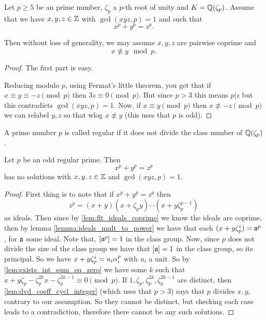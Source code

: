 \begin{lemma}\label{lemma:may_assume}

	Let $p \geq 5$ be an prime number, $\zeta_p$ a $p$-th root of unity and $K=\mathbb{Q}(\zeta_p)$.  Assume that we have $x,y,z \in \mathbb{Z}$ with $\gcd(xyz,p)=1$ and such that \[x^p+y^p=z^p.\]

Then without loss of generality, we may assume $x,y,z$ are pairwise coprime and \[x \not \equiv y \mod p.\]
\end{lemma}



\begin{proof}
The first part is easy.

Reducing modulo $p$, using Fermat's little theorem, you get that if $x \equiv y \equiv -z \pmod p$ then $3z \equiv 0 \pmod p$. But since $p >3$ this means $p |z$ but this contradicts $\gcd(xyz,p)=1$. Now, if $x \equiv y \pmod p$ then  $x \not \equiv -z \pmod p$ we can relabel $y,z$ so that wlog $x \not \equiv y$ (this uses that $p$ is odd).

\end{proof}

\begin{definition}\label{defn:is_regular_number}
	\leanok
	A prime number $p$ is called regular if it does not divide the class number of $\mathbb{Q}(\zeta_p)$.
\end{definition}


\begin{theorem}\label{theorem:FLT_case_one}
    \leanok
	Let $p$ be an odd regular prime. Then \[x^p+y^p=z^p\] has no solutions with $x,y,z \in \mathbb{Z}$ and $\gcd(xyz,p)=1$.
\end{theorem}
\begin{proof}
	First thing is to note that if $x^p+y^p=z^p$ then \[z^p=(x+y)(x+\zeta_py)\cdots(x+y\zeta_p^{p-1})\] as ideals. Then since by \ref{lem:flt_ideals_coprime} we know the ideals are coprime, then by lemma \ref{lemma:ideals_mult_to_power} we have that each $(x+y\zeta_p^i)=\mathfrak{a}^p$, for $\mathfrak{a}$ some ideal. Note that, $[\mathfrak{a}^p]=1$ in the class group. Now, since $p$ does not divide the size of the class group we have that $[\mathfrak{a}]=1$ in the class group, so its principal. So we have $x+y\zeta_p^i=u_i\alpha_i^p$ with $u_i$ a unit. So by \ref{lem:exists_int_sum_eq_zero} we have some $k$ such that $x+y\zeta_p-\zeta_p^{2k}x-\zeta_p^{2k-1} \equiv 0 \pmod p$. If $1,\zeta_p,\zeta_p^{2k},\zeta_p^{2k-1}$ are distinct, then \ref{lem:dvd_coeff_cycl_integer} (which uses that $p>3$) says that $p$  divides $x,y$, contrary to our assumption. So they cannot be distinct, but checking each case leads to a contradiction, therefore there cannot be any such solutions.
\end{proof}

